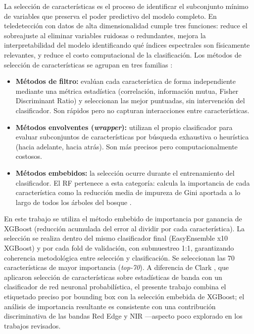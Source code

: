 La selección de características es el proceso de identificar el subconjunto
mínimo de variables que preserva el poder predictivo del modelo completo.
En teledetección con datos de alta dimensionalidad cumple tres funciones:
reduce el sobreajuste al eliminar variables ruidosas o redundantes, mejora
la interpretabilidad del modelo identificando qué índices espectrales son
físicamente relevantes, y reduce el costo computacional de la clasificación.
Los métodos de selección de características se agrupan en tres familias
\cite{makki2017,silva2019}:

\begin{itemize}
  \item \textbf{Métodos de filtro:} evalúan cada característica de forma
    independiente mediante una métrica estadística (correlación, información
    mutua, Fisher Discriminant Ratio) y seleccionan las mejor puntuadas, sin
    intervención del clasificador. Son rápidos pero no capturan interacciones
    entre características.
  \item \textbf{Métodos envolventes (\textit{wrapper}):} utilizan el propio
    clasificador para evaluar subconjuntos de características por búsqueda
    exhaustiva o heurística (hacia adelante, hacia atrás). Son más precisos
    pero computacionalmente costosos.
  \item \textbf{Métodos embebidos:} la selección ocurre durante el
    entrenamiento del clasificador. El \ac{RF} pertenece a esta categoría:
    calcula la importancia de cada característica como la reducción media de
    impureza de Gini aportada a lo largo de todos los árboles del bosque
    \cite{breiman2001}.
\end{itemize}

En este trabajo se utiliza el método embebido de importancia por ganancia
de \ac{XGBoost} (reducción acumulada del error al dividir por cada
característica). La selección se realiza dentro del mismo clasificador final
(EasyEnsemble x10 XGBoost) y por cada fold de validación, con submuestreo
1:1, garantizando coherencia metodológica entre selección y clasificación.
Se seleccionan las 70 características de mayor importancia (\textit{top-70}).
A diferencia de Clark \etal{}, que aplicaron selección de características
sobre estadísticas de banda con un clasificador de red neuronal probabilística,
el presente trabajo combina el etiquetado preciso por bounding box con la
selección embebida de XGBoost; el análisis de importancia resultante es consistente
con una contribución discriminativa de las bandas Red Edge y \ac{NIR} ---aspecto
poco explorado en los trabajos revisados.

